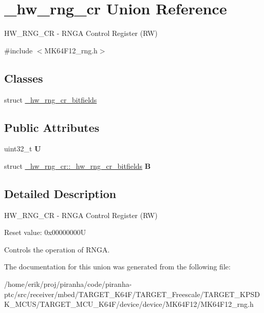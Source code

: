 \hypertarget{union__hw__rng__cr}{}\section{\+\_\+hw\+\_\+rng\+\_\+cr Union Reference}
\label{union__hw__rng__cr}


H\+W\+\_\+\+R\+N\+G\+\_\+\+CR -\/ R\+N\+GA Control Register (RW)  




{\ttfamily \#include $<$M\+K64\+F12\+\_\+rng.\+h$>$}

\subsection*{Classes}
\begin{DoxyCompactItemize}
\item 
struct \hyperlink{struct__hw__rng__cr_1_1__hw__rng__cr__bitfields}{\+\_\+hw\+\_\+rng\+\_\+cr\+\_\+bitfields}
\end{DoxyCompactItemize}
\subsection*{Public Attributes}
\begin{DoxyCompactItemize}
\item 
uint32\+\_\+t {\bfseries U}\hypertarget{union__hw__rng__cr_a445301b4e19e012e0f81e907a9a087f6}{}\label{union__hw__rng__cr_a445301b4e19e012e0f81e907a9a087f6}

\item 
struct \hyperlink{struct__hw__rng__cr_1_1__hw__rng__cr__bitfields}{\+\_\+hw\+\_\+rng\+\_\+cr\+::\+\_\+hw\+\_\+rng\+\_\+cr\+\_\+bitfields} {\bfseries B}\hypertarget{union__hw__rng__cr_ae338b0973b63b65c34e49ae064e10e14}{}\label{union__hw__rng__cr_ae338b0973b63b65c34e49ae064e10e14}

\end{DoxyCompactItemize}


\subsection{Detailed Description}
H\+W\+\_\+\+R\+N\+G\+\_\+\+CR -\/ R\+N\+GA Control Register (RW) 

Reset value\+: 0x00000000U

Controls the operation of R\+N\+GA. 

The documentation for this union was generated from the following file\+:\begin{DoxyCompactItemize}
\item 
/home/erik/proj/piranha/code/piranha-\/ptc/src/receiver/mbed/\+T\+A\+R\+G\+E\+T\+\_\+\+K64\+F/\+T\+A\+R\+G\+E\+T\+\_\+\+Freescale/\+T\+A\+R\+G\+E\+T\+\_\+\+K\+P\+S\+D\+K\+\_\+\+M\+C\+U\+S/\+T\+A\+R\+G\+E\+T\+\_\+\+M\+C\+U\+\_\+\+K64\+F/device/device/\+M\+K64\+F12/M\+K64\+F12\+\_\+rng.\+h\end{DoxyCompactItemize}
